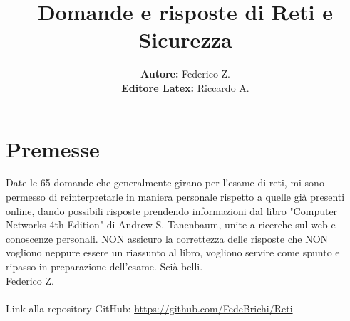 

\author{\textbf{Autore:} Federico Z. \\ \textbf{Editore Latex:} Riccardo A.}
\title{\textbf{Domande e risposte di Reti e Sicurezza}}



\maketitle
\vspace{5cm}
\section*{Premesse}
Date le 65 domande che generalmente girano per l'esame di reti, mi sono permesso di reinterpretarle in maniera personale rispetto a quelle già presenti online, dando possibili risposte prendendo informazioni dal libro "Computer Networks 4th Edition" di Andrew S. Tanenbaum, unite a ricerche sul web e conoscenze personali. NON assicuro la correttezza delle risposte che NON vogliono neppure essere un riassunto al libro, vogliono servire come spunto e ripasso in preparazione dell'esame. Scià belli. \\
Federico Z. \\
\vspace{1cm} \\
Link alla repository GitHub: \url{https://github.com/FedeBrichi/Reti}

\newpage
\tableofcontents
\newpage



